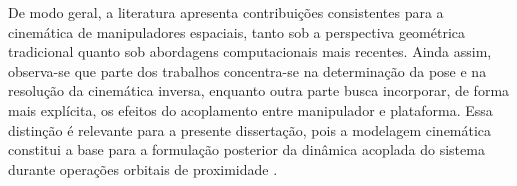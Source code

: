 De modo geral, a literatura apresenta contribuições consistentes para a cinemática de manipuladores espaciais, tanto sob a perspectiva geométrica tradicional quanto sob abordagens computacionais mais recentes. Ainda assim, observa-se que parte dos trabalhos concentra-se na determinação da pose e na resolução da cinemática inversa, enquanto outra parte busca incorporar, de forma mais explícita, os efeitos do acoplamento entre manipulador e plataforma. Essa distinção é relevante para a presente dissertação, pois a modelagem cinemática constitui a base para a formulação posterior da dinâmica acoplada do sistema durante operações orbitais de proximidade \cite{fonseca2019kinematics,fonseca2016dynamics,santos2022uncertainty}.